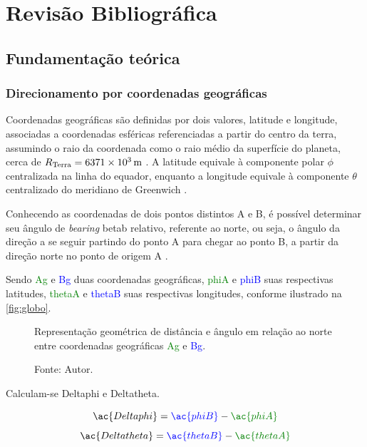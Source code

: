 \chapter{Revisão Bibliográfica}

\section{Fundamentação teórica}

\subsection{Direcionamento por coordenadas geográficas}

Coordenadas geográficas são definidas por dois valores, latitude e longitude, associadas a coordenadas esféricas referenciadas a partir do centro da terra, assumindo o raio da coordenada como o raio médio da superfície do planeta, cerca de $R_\text{Terra} = \SI{6371E3}{\metre}$ \cite{palomaguitarrara, chrisveness}.
A latitude equivale à componente polar $\phi$ centralizada na linha do equador, enquanto a longitude equivale à componente $\theta$ centralizado do meridiano de Greenwich \cite{palomaguitarrara, henriquefleming2003}.

Conhecendo as coordenadas de dois pontos distintos A e B, é possível determinar seu ângulo de \textit{bearing} \ac{betab} relativo, referente ao norte, ou seja, o ângulo da direção a se seguir partindo do ponto A para chegar ao ponto B, a partir da direção norte no ponto de origem A \cite{henriquefleming2003}.

Sendo \textcolor{Green}{\ac{Ag}} e \textcolor{Blue}{\ac{Bg}} duas coordenadas geográficas, \textcolor{Green}{\ac{phiA}} e \textcolor{Blue}{\ac{phiB}} suas respectivas latitudes,  \textcolor{Green}{\ac{thetaA}} e \textcolor{Blue}{\ac{thetaB}} suas respectivas longitudes, conforme ilustrado na \autoref{fig:globo}.

\begin{figure}[htbp]
    \centering
    \caption{Representação geométrica de distância e ângulo em relação ao norte entre coordenadas geográficas \textcolor{Green}{\ac{Ag}} e \textcolor{Blue}{\ac{Bg}}.}
    
    \caption*{Fonte: Autor.}
    \label{fig:globo}
\end{figure}

Calculam-se \ac{Deltaphi} e \ac{Deltatheta}.

    \begin{equation}
        \ac{Deltaphi} = \textcolor{Blue}{\ac{phiB}} - \textcolor{Green}{\ac{phiA}}
    \end{equation}
    \begin{equation}
        \ac{Deltatheta} = \textcolor{Blue}{\ac{thetaB}} - \textcolor{Green}{\ac{thetaA}}
    \end{equation}

